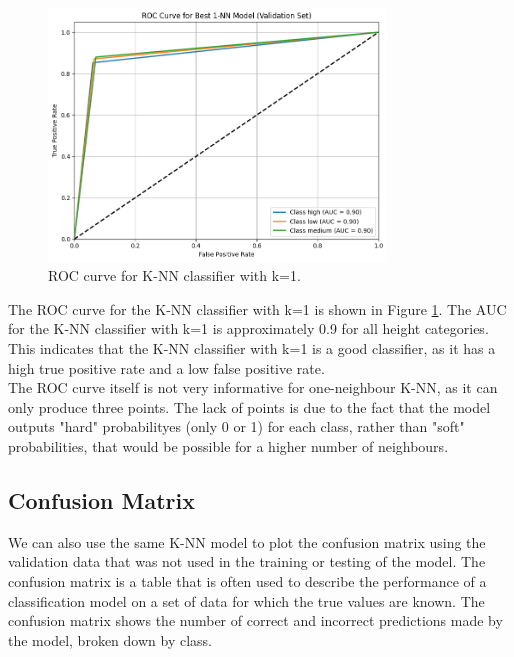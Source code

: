 \documentclass[12pt]{article}
\begin{document}
\begin{figure}[H]
\centering
\includegraphics[width=0.8\textwidth]{figures/knn_roc_curve.png}
\caption{ROC curve for K-NN classifier with k=1.}
\label{fig:knn_roc_curve}
\end{figure}

The ROC curve for the K-NN classifier with k=1 is shown in Figure \ref{fig:knn_roc_curve}. The AUC for the K-NN classifier with k=1 is approximately 0.9 for all height categories. This indicates that the K-NN classifier with k=1 is a good classifier, as it has a high true positive rate and a low false positive rate. 
\\
The ROC curve itself is not very informative for one-neighbour K-NN, as it can only produce three points. The lack of points is due to the fact that the model outputs "hard" probabilityes (only 0 or 1) for each class, rather than "soft" probabilities, that would be possible for a higher number of neighbours. 
\\

\subsection{Confusion Matrix}
\noindent
We can also use the same K-NN model to plot the confusion matrix using the validation data that was not used in the training or testing of the model. The confusion matrix is a table that is often used to describe the performance of a classification model on a set of data for which the true values are known. The confusion matrix shows the number of correct and incorrect predictions made by the model, broken down by class.
\end{document}
